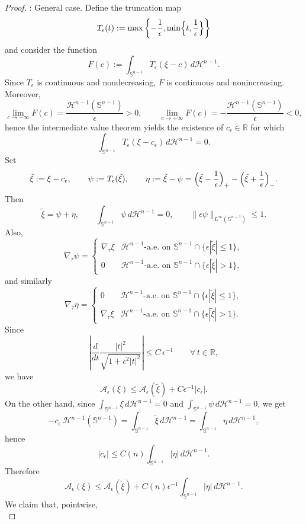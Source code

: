 \documentclass[10pt,a4paper]{amsart}
\def\ez{\epsilon}
\begin{document}
\begin{proof}
\medskip
{}: General case.
Define the truncation map
$$
T_\epsilon(t):=\max\left\{-\frac1\epsilon,\min\Bigl\{t,\frac1\epsilon\Bigr\}\right\}
$$
and consider the function
$$
F(c):=\int_{\mathbb S^{n-1}} T_\epsilon(\xi-c)\,d\mathscr H^{n-1}.
$$
Since $T_\epsilon$ is continuous and nondecreasing, $F$ is continuous and nonincreasing.
Moreover,
$$
\lim_{c\to-\infty}F(c)=\frac{\mathscr H^{n-1}(\mathbb S^{n-1})}{\epsilon}>0,
\qquad
\lim_{c\to+\infty}F(c)=-\frac{\mathscr H^{n-1}(\mathbb S^{n-1})}{\epsilon}<0,
$$
hence the intermediate value theorem yields the existence of $c_\epsilon\in\mathbb R$ for which 
$$
\int_{\mathbb S^{n-1}} T_\epsilon(\xi-c_\epsilon)\,d\mathscr H^{n-1}=0.
$$
Set
$$
\tilde\xi:=\xi-c_\epsilon,\qquad
\psi:=T_\epsilon(\tilde\xi),\qquad
\eta:=\tilde\xi-\psi
=
\Bigl(\tilde\xi-\frac 1 \ez \Bigr)_+-\Bigl(\tilde\xi+\frac 1 \ez \Bigr)_-.
$$
Then
$$
\tilde\xi=\psi+\eta,\qquad \int_{\mathbb S^{n-1}}\psi\,d\mathscr H^{n-1}=0,
\qquad \|\epsilon\psi\|_{L^\infty(\mathbb S^{n-1})}\le 1.
$$
Also,
$$
\nabla_\tau\psi=\left\{
\begin{array}{ll}
\nabla_\tau\xi& \text{$\mathscr H^{n-1}$-a.e. on $\mathbb S^{n-1}\cap \{\ez|\tilde\xi|\leq  1\}$},\\
0& \text{$\mathscr H^{n-1}$-a.e. on $\mathbb S^{n-1}\cap \{\ez|\tilde\xi|> 1\}$},
\end{array}\right.
$$
and similarly
$$
\nabla_\tau\eta=\left\{
\begin{array}{ll}
0& \text{$\mathscr H^{n-1}$-a.e. on $\mathbb S^{n-1}\cap \{\ez|\tilde\xi|\leq  1\}$},\\
\nabla_\tau\xi& \text{$\mathscr H^{n-1}$-a.e. on $\mathbb S^{n-1}\cap \{\ez|\tilde\xi|> 1\}$}.
\end{array}\right.
$$
Since
$$
\left|\frac{d}{dt}\frac{|t|^2}{\sqrt{1+\epsilon^2|t|^2}}\right|
\le C\,\epsilon^{-1}\qquad\forall\,t\in\mathbb R,
$$
we have
$$
\mathcal A_\epsilon(\xi)\le \mathcal A_\epsilon(\tilde\xi)+C\epsilon^{-1}|c_\epsilon|.
$$
On the other hand, since $\int_{\mathbb S^{n-1}}\xi\,d\mathscr H^{n-1}=0$ and
$\int_{\mathbb S^{n-1}}\psi\,d\mathscr H^{n-1}=0$, we get
$$
-c_\epsilon\,\mathscr H^{n-1}(\mathbb S^{n-1})
=\int_{\mathbb S^{n-1}}\tilde\xi\,d\mathscr H^{n-1}
=\int_{\mathbb S^{n-1}}\eta\,d\mathscr H^{n-1},
$$
hence
$$
|c_\epsilon|\le C(n)\int_{\mathbb S^{n-1}}|\eta|\,d\mathscr H^{n-1}.
$$
Therefore
$$
\mathcal A_\epsilon(\xi)\le \mathcal A_\epsilon(\tilde\xi)+C(n)\epsilon^{-1}\int_{\mathbb S^{n-1}}|\eta|\,d\mathscr H^{n-1}.
$$
We claim that, pointwise,
\begin{equation}\label{pointwise tilde xi}

\end{equation}
\end{proof}
\end{document}
